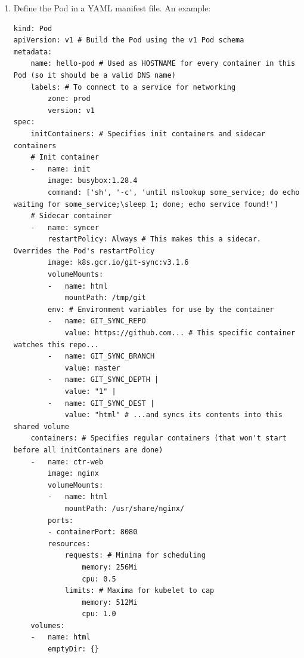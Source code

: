 \documentclass[table, xcdraw]{article}%
\begin{document}
\begin{enumerate}
    \item Define the Pod in a YAML manifest file. An example:
	\begin{verbatim}
kind: Pod
apiVersion: v1 # Build the Pod using the v1 Pod schema
metadata:
    name: hello-pod # Used as HOSTNAME for every container in this Pod (so it should be a valid DNS name)
    labels: # To connect to a service for networking
        zone: prod
        version: v1
spec:
    initContainers: # Specifies init containers and sidecar containers
    # Init container
    -   name: init
        image: busybox:1.28.4
        command: ['sh', '-c', 'until nslookup some_service; do echo waiting for some_service;\sleep 1; done; echo service found!']
    # Sidecar container
    -   name: syncer
        restartPolicy: Always # This makes this a sidecar. Overrides the Pod's restartPolicy
        image: k8s.gcr.io/git-sync:v3.1.6
        volumeMounts:
        -   name: html
            mountPath: /tmp/git
        env: # Environment variables for use by the container
        -   name: GIT_SYNC_REPO
            value: https://github.com... # This specific container watches this repo...
        -   name: GIT_SYNC_BRANCH
            value: master
        -   name: GIT_SYNC_DEPTH |
            value: "1" |
        -   name: GIT_SYNC_DEST |
            value: "html" # ...and syncs its contents into this shared volume
    containers: # Specifies regular containers (that won't start before all initContainers are done)
    -   name: ctr-web
        image: nginx
        volumeMounts:
        -   name: html
            mountPath: /usr/share/nginx/
        ports:
        - containerPort: 8080
        resources:
            requests: # Minima for scheduling
                memory: 256Mi
                cpu: 0.5
            limits: # Maxima for kubelet to cap
                memory: 512Mi
                cpu: 1.0
    volumes:
    -   name: html
        emptyDir: {}       
	\end{verbatim}
	

\end{enumerate}
\end{document}
